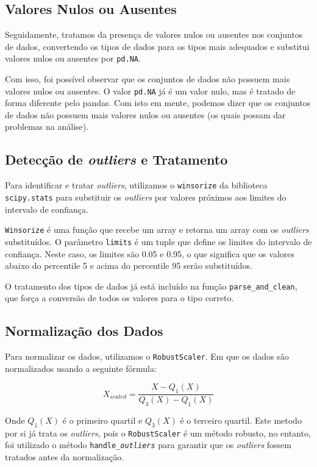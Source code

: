 \documentclass{article}
\begin{document}
\subsection{Valores Nulos ou Ausentes}
Seguidamente, tratamos da presença de valores nulos ou ausentes nos conjuntos de dados, convertendo os tipos de dados para os tipos mais adequados e substitui valores nulos ou ausentes por \texttt{pd.NA}.

Com isso, foi possível observar que os conjuntos de dados não possuem mais valores nulos ou ausentes. O valor \texttt{pd.NA} já é um valor nulo, mas é tratado de forma diferente pelo pandas. Com isto em mente, podemos dizer que os conjuntos de dados não possuem mais valores nulos ou ausentes (os quais possam dar problemas na análise).

\subsection{Detecção de \textit{outliers} e Tratamento}
Para identificar e tratar \textit{outliers}, utilizamos o \texttt{winsorize} da biblioteca \texttt{scipy.stats} para substituir os \textit{outliers} por valores próximos aos limites do intervalo de confiança.

\texttt{Winsorize} é uma função que recebe um array e retorna um array com os \textit{outliers} substituídos. O parâmetro \texttt{limits} é um tuple que define os limites do intervalo de confiança. Neste caso, os limites são 0.05 e 0.95, o que significa que os valores abaixo do percentile 5 e acima do percentile 95 serão substituídos.

O tratamento dos tipos de dados já está incluído na função \texttt{parse\_and\_clean}, que força a conversão de todos os valores para o tipo correto.

\subsection{Normalização dos Dados}
Para normalizar os dados, utilizamos o \texttt{RobustScaler}. Em que os dados são normalizados usando a seguinte fórmula:

\begin{equation}
  X_{scaled} = \frac{X - Q_1(X)}{Q_3(X) - Q_1(X)}
\end{equation}

Onde $Q_1(X)$ é o primeiro quartil e $Q_3(X)$ é o terceiro quartil.
Este metodo por si já trata os \textit{outliers}, pois o \texttt{RobustScaler} é um método robusto, no entanto, foi utilizado o método \texttt{handle\_\textit{outliers}} para garantir que os \textit{outliers} fossem tratados antes da normalização.
\end{document}
